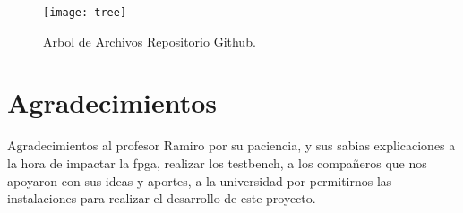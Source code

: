 \documentclass[a4paper]{article}
\begin{document}
\begin{figure}[H]
  \centering
     \texttt{[image: tree]}
  \caption{Arbol de Archivos Repositorio Github.}
   \label{fig:treee}   
\end{figure}

\clearpage
\newpage
\section{Agradecimientos}
Agradecimientos al profesor Ramiro por su paciencia, y sus sabias explicaciones a la hora de impactar la fpga, realizar los testbench, a los compañeros que nos apoyaron con sus ideas y aportes, a la universidad por permitirnos las instalaciones para realizar el desarrollo de este proyecto. 
\end{document}
